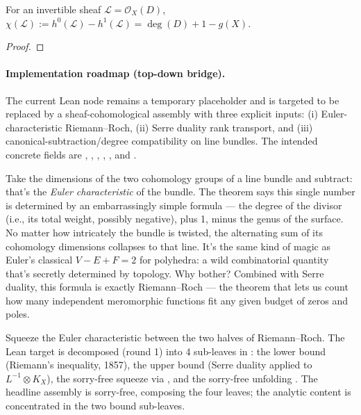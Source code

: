 \begin{theorem}
\label{thm:euler-char-line-bundle}
For an invertible sheaf \(\mathcal{L}=\mathcal{O}_X(D)\),
\(\chi(\mathcal{L}) := h^{0}(\mathcal{L}) - h^{1}(\mathcal{L})
                     = \deg(D) + 1 - g(X).\)
\leanok
\end{theorem}
\begin{proof}
\leanok\end{proof}

\paragraph{Implementation roadmap (top-down bridge).}
The current Lean node  remains a temporary
placeholder and is targeted to be replaced by a sheaf-cohomological
assembly with three explicit inputs: (i) Euler-characteristic Riemann--Roch,
(ii) Serre duality rank transport, and (iii) canonical-subtraction/degree
compatibility on line bundles. The intended concrete fields are
, , ,
, , and
.

\begin{layman}
Take the dimensions of the two cohomology groups of a line bundle and
subtract: that's the \emph{Euler characteristic} of the bundle. The
theorem says this single number is determined by an embarrassingly simple
formula --- the degree of the divisor (i.e., its total weight, possibly
negative), plus 1, minus the genus of the surface. No matter how
intricately the bundle is twisted, the alternating sum of its cohomology
dimensions collapses to that line. It's the same kind of magic as
Euler's classical \(V - E + F = 2\) for polyhedra: a wild combinatorial
quantity that's secretly determined by topology. Why bother? Combined
with Serre duality, this formula is exactly Riemann--Roch --- the theorem
that lets us count how many independent meromorphic functions fit any
given budget of zeros and poles.
\end{layman}

\begin{proofsketch}
Squeeze the Euler characteristic between the two halves of Riemann--Roch.
The Lean target is decomposed (round 1) into 4 sub-leaves in
: the lower
bound  (Riemann's inequality, 1857), the
upper bound  (Serre duality applied to
\(L^{-1}\otimes K_X\)), the sorry-free squeeze
 via , and
the sorry-free unfolding .
The headline assembly is sorry-free, composing the four leaves; the
analytic content is concentrated in the two bound sub-leaves.
\end{proofsketch}


